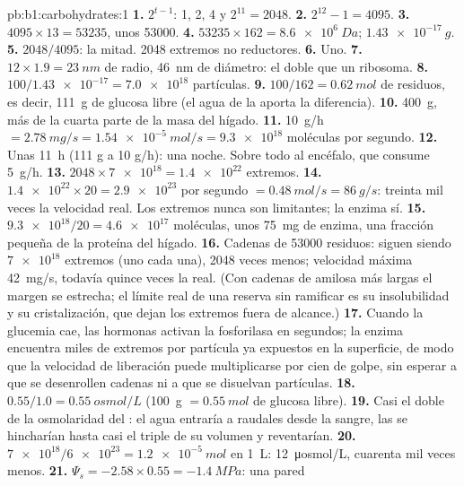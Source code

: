 \begin{solution}{pb:b1:carbohydrates:1}
\textbf{1.} $2^{t-1}$: 1, 2, 4 y $2^{11} = 2048$.
\textbf{2.} $2^{12} - 1 = 4095$.
\textbf{3.} $4095\times 13 = \num{53235}$, unos \num{53000}.
\textbf{4.} $\num{53235}\times 162 = \qty{8.6e6}{Da}$;
$\qty{1.43e-17}{g}$.
\textbf{5.} $2048/4095$: la mitad. \num{2048} extremos no reductores.
\textbf{6.} Uno.
\textbf{7.} $12\times 1.9 = \qty{23}{nm}$ de radio, \qty{46}{nm} de
diámetro: el doble que un ribosoma.
\textbf{8.} $100/\num{1.43e-17} = \num{7.0e18}$ partículas.
\textbf{9.} $100/162 = \qty{0.62}{mol}$ de residuos, es decir, \qty{111}{g}
de glucosa libre (el agua de la  aporta la diferencia).
\textbf{10.} \qty{400}{g}, más de la cuarta parte de la masa del hígado.
\textbf{11.} \qty{10}{g/h} $= \qty{2.78}{mg/s} = \qty{1.54e-5}{mol/s} =
\num{9.3e18}$ moléculas por segundo.
\textbf{12.} Unas \qty{11}{h} (111 g a 10 g/h): una noche. Sobre todo al
encéfalo, que consume \qty{5}{g/h}.
\textbf{13.} $2048\times\num{7e18} = \num{1.4e22}$ extremos.
\textbf{14.} $\num{1.4e22}\times 20 = \num{2.9e23}$ por segundo $=
\qty{0.48}{mol/s} = \qty{86}{g/s}$: treinta mil veces la velocidad real. Los
extremos nunca son limitantes; la enzima sí.
\textbf{15.} $\num{9.3e18}/20 = \num{4.6e17}$ moléculas, unos
\qty{75}{mg} de enzima, una fracción pequeña de la proteína del hígado.
\textbf{16.} Cadenas de \num{53000} residuos: siguen siendo $\num{7e18}$
extremos (uno cada una), \num{2048} veces menos; velocidad máxima
\qty{42}{mg/s}, todavía quince veces la real. (Con cadenas de amilosa más
largas el margen se estrecha; el límite real de una reserva sin ramificar es
su insolubilidad y su cristalización, que dejan los extremos fuera de
alcance.)
\textbf{17.} Cuando la glucemia cae, las hormonas activan la fosforilasa en
segundos; la enzima encuentra miles de extremos por partícula ya expuestos
en la superficie, de modo que la velocidad de liberación puede multiplicarse
por cien de golpe, sin esperar a que se desenrollen cadenas ni a que se
disuelvan partículas.
\textbf{18.} $0.55/1.0 = \qty{0.55}{osmol/L}$ (\qty{100}{g}
$= \qty{0.55}{mol}$ de glucosa libre).
\textbf{19.} Casi el doble de la osmolaridad del : el agua entraría a
raudales desde la sangre, las  se hincharían hasta casi el triple de
su volumen y reventarían.
\textbf{20.} $\num{7e18}/\num{6e23} = \qty{1.2e-5}{mol}$ en \qty{1}{L}:
\qty{12}{\micro osmol/L}, cuarenta mil veces menos.
\textbf{21.} $\Psi_s = -2.58\times 0.55 = \qty{-1.4}{MPa}$: una pared

\end{solution}
